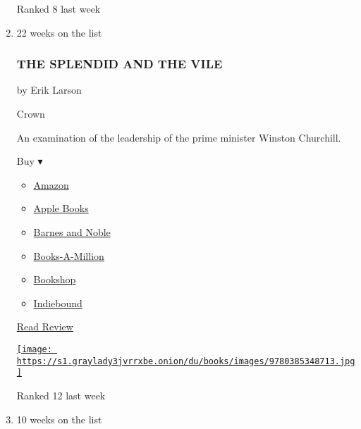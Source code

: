 \begin{enumerate}
  Ranked 8 last week
\item
  \href{https://www.nytimes3xbfgragh.onion/2020/02/25/books/review/the-splendid-and-the-vile-erik-larson.html}{}

  22 weeks on the list

  \hypertarget{the-splendid-and-the-vile}{%
  \subsubsection{THE SPLENDID AND THE
  VILE}\label{the-splendid-and-the-vile}}

  by Erik Larson

  Crown

  An examination of the leadership of the prime minister Winston
  Churchill.

  Buy ▾

  \begin{itemize}
  \tightlist
  \item
    \href{https://www.amazon.com/Splendid-Vile-Churchill-Family-Defiance/dp/0385348711?tag=NYTBS-20}{Amazon}
  \item
    \href{https://du-gae-books-dot-nyt-du-prd.appspot.com/buy?title=THE+SPLENDID+AND+THE+VILE\&author=Erik+Larson}{Apple
    Books}
  \item
    \href{https://www.anrdoezrs.net/click-7990613-11819508?url=https\%3A\%2F\%2Fwww.barnesandnoble.com\%2Fw\%2F\%3Fean\%3D9780385348713}{Barnes
    and Noble}
  \item
    \href{https://www.anrdoezrs.net/click-7990613-35140?url=https\%3A\%2F\%2Fwww.booksamillion.com\%2Fp\%2FTHE\%2BSPLENDID\%2BAND\%2BTHE\%2BVILE\%2FErik\%2BLarson\%2F9780385348713}{Books-A-Million}
  \item
    \href{https://bookshop.org/a/3546/9780385348713}{Bookshop}
  \item
    \href{https://www.indiebound.org/book/9780385348713?aff=NYT}{Indiebound}
  \end{itemize}

  \href{https://www.nytimes3xbfgragh.onion/2020/02/25/books/review/the-splendid-and-the-vile-erik-larson.html}{Read
  Review}

  \href{https://www.nytimes3xbfgragh.onion/2020/02/25/books/review/the-splendid-and-the-vile-erik-larson.html}{\texttt{[image: https://s1.graylady3jvrrxbe.onion/du/books/images/9780385348713.jpg]}}

  Ranked 12 last week
\item
  10 weeks on the list


\end{enumerate}
